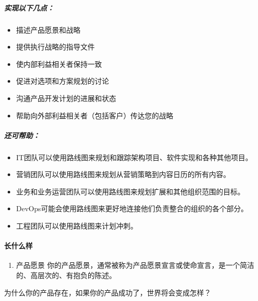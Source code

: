 \documentclass[letterpaper,10pt,english]{sphinxmanual}
\begin{document}
\subparagraph{实现以下几点：}
\label{\detokenize{chapter_project/Roadmap:id2}}\begin{itemize}
\item {} 
描述产品愿景和战略

\item {} 
提供执行战略的指导文件

\item {} 
使内部利益相关者保持一致

\item {} 
促进对选项和方案规划的讨论

\item {} 
沟通产品开发计划的进展和状态

\item {} 
帮助向外部利益相关者（包括客户）传达您的战略

\end{itemize}


\subparagraph{还可帮助：}
\label{\detokenize{chapter_project/Roadmap:id3}}\begin{itemize}
\item {} 
IT团队可以使用路线图来规划和跟踪架构项目、软件实现和各种其他项目。

\item {} 
营销团队可以使用路线图来规划从营销策略到内容日历的所有内容。

\item {} 
业务和业务运营团队可以使用路线图来规划扩展和其他组织范围的目标。

\item {} 
DevOps可能会使用路线图来更好地连接他们负责整合的组织的各个部分。

\item {} 
工程团队可以使用路线图来计划冲刺。

\end{itemize}


\paragraph{长什么样}
\label{\detokenize{chapter_project/Roadmap:id4}}\begin{enumerate}
%
\item {} 
产品愿景
你的产品愿景，通常被称为产品愿景宣言或使命宣言，是一个简洁的、高层次的、有抱负的陈述。

\end{enumerate}

为什么你的产品存在，如果你的产品成功了，世界将会变成怎样？
\end{document}
